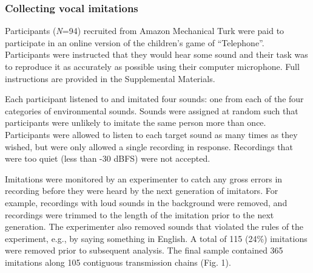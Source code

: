\documentclass[english,floatsintext,man]{apa6}
\theoremstyle{definition}
\theoremstyle{definition}
\theoremstyle{definition}
\theoremstyle{remark}
\begin{document}
\hypertarget{collecting-vocal-imitations}{%
\subsubsection{Collecting vocal
imitations}\label{collecting-vocal-imitations}}

Participants (\emph{N}=94) recruited from Amazon Mechanical Turk were
paid to participate in an online version of the children's game of
\enquote{Telephone}. Participants were instructed that they would hear
some sound and their task was to reproduce it as accurately as possible
using their computer microphone. Full instructions are provided in the
Supplemental Materials.

Each participant listened to and imitated four sounds: one from each of
the four categories of environmental sounds. Sounds were assigned at
random such that participants were unlikely to imitate the same person
more than once. Participants were allowed to listen to each target sound
as many times as they wished, but were only allowed a single recording
in response. Recordings that were too quiet (less than -30 dBFS) were
not accepted.

Imitations were monitored by an experimenter to catch any gross errors
in recording before they were heard by the next generation of imitators.
For example, recordings with loud sounds in the background were removed,
and recordings were trimmed to the length of the imitation prior to the
next generation. The experimenter also removed sounds that violated the
rules of the experiment, e.g., by saying something in English. A total
of 115 (24\%) imitations were removed prior to subsequent analysis. The
final sample contained 365 imitations along 105 contiguous transmission
chains (Fig. 1).
\end{document}
